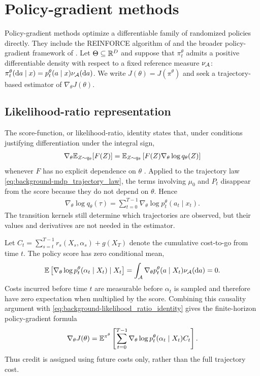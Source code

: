\section{Policy-gradient methods}
\label{sec:background-policy_gradient}

Policy-gradient methods optimize a differentiable family of randomized policies directly. They include the REINFORCE algorithm of \cite{williams1992reinforce} and the broader policy-gradient framework of \cite{sutton1999policygradient}. Let $\Theta\subseteq \mathbb{R}^D$ and suppose that $\pi_t^\theta$ admits a positive differentiable density with respect to a fixed reference measure $\nu_{\cal A}$: $\pi_t^\theta(\mathrm{d} a\mid x) = p_t^\theta(a\mid x)\nu_{\cal A}(\mathrm{d} a)$.
We write $J(\theta)=J(\pi^\theta)$ and seek a trajectory-based estimator of $\nabla_\theta J(\theta)$.

\subsection{Likelihood-ratio representation}

The score-function, or likelihood-ratio, identity states that, under conditions justifying differentiation under the integral sign,
\begin{align}
    \label{eq:background-likelihood_ratio_identity}
    \nabla_\theta \mathbb{E}_{Z\sim q_\theta}[F(Z)] = \mathbb{E}_{Z\sim q_\theta}\left[F(Z)\nabla_\theta\log q_\theta(Z) \right]
\end{align}
whenever $F$ has no explicit dependence on $\theta$ \cite{lecuyer1990likelihood}. Applied to the trajectory law \eqref{eq:background-mdp_trajectory_law}, the terms involving $\mu_0$ and $P_t$ disappear from the score because they do not depend on $\theta$. Hence
\begin{align}
    \label{eq:background-trajectory_score}
    \nabla_\theta\log q_\theta(\tau) = \sum_{t=0}^{T-1} \nabla_\theta\log p_t^\theta(a_t\mid x_t).
\end{align}
The transition kernels still determine which trajectories are observed, but their values and derivatives are not needed in the estimator.

Let $C_t = \sum_{s=t}^{T-1} r_s(X_s,\alpha_s) + g(X_T)$ denote the cumulative cost-to-go from time $t$. The policy score has zero conditional mean,
\begin{align}
    \label{eq:background-score_zero_expectation}
    \mathbb{E}\left[\nabla_\theta\log p_t^\theta(\alpha_t\mid X_t) \mid X_t \right] = \int_{\cal A} \nabla_\theta p_t^\theta(a\mid X_t)\nu_{\cal A}(\mathrm{d} a) = 0.
\end{align}
Costs incurred before time $t$ are measurable before $\alpha_t$ is sampled and therefore have zero expectation when multiplied by the score. Combining this causality argument with \eqref{eq:background-likelihood_ratio_identity} gives the finite-horizon policy-gradient formula
\begin{align}
    \label{eq:background-reinforce_gradient}
    \nabla_\theta J(\theta) = \mathbb{E}^{\pi^\theta} \left[\sum_{t=0}^{T-1} \nabla_\theta\log p_t^\theta(\alpha_t\mid X_t) C_t \right].
\end{align}
Thus credit is assigned using future costs only, rather than the full
trajectory cost.

